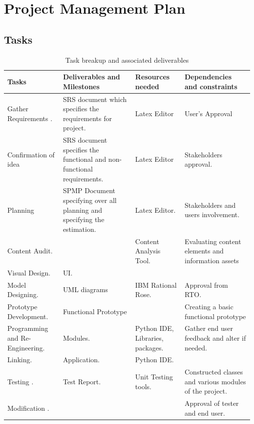 \section{Project Management Plan}
\subsection{Tasks}
\begin{table}[h!]
\caption{Task breakup and associated deliverables}
  \centering
\begin{tabular}{ |p{3.0cm}| p{3.5cm} | p{3.5cm} | p{3.5cm}| }
\hline
Tasks& Deliverables and Milestones & Resources needed & Dependencies and constraints \\ 
\hline
Gather Requirements . &SRS document which specifies the requirements for project.& Latex Editor&User’s Approval \\ 
\hline
Confirmation of idea  & SRS document specifies the functional and non-functional requirements. &Latex Editor&Stakeholders approval.\\
 \hline
Planning& SPMP Document specifying over all planning and specifying the estimation.&Latex Editor.&Stakeholders and users involvement.\\ 
\hline
Content Audit.&&Content Analysis Tool.& Evaluating content elements and information assets\\ 
\hline
Visual Design.&UI.&&\\
 \hline
Model Designing.&UML diagrams&IBM Rational Rose.&Approval from RTO.\\ 
\hline
Prototype Development.&Functional Prototype && Creating a basic functional prototype\\ 
\hline
Programming and Re-Engineering.& Modules.& Python IDE, Libraries, packages.& Gather end user feedback and alter if needed. \\ 
\hline
Linking.&Application.&Python IDE.& \\
 \hline
Testing .&Test Report.&Unit Testing tools.&Constructed classes and various modules of the project.\\ 
\hline
Modification .&&&Approval of tester and end user.\\ 
\hline
\end{tabular}
\end{table}
\newpage
